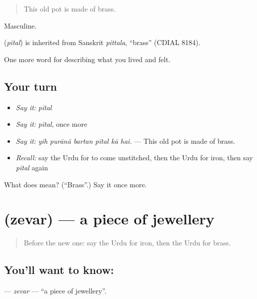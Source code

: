 \begin{quote}
This old pot is made of brass.
\end{quote}

Masculine.

\begin{cousinweb}
\textbf{} (\emph{pītal}) is inherited from Sanskrit \emph{pittala}, \textquotedblleft{}brass\textquotedblright{} (CDIAL 8184).
\end{cousinweb}

\begin{grammarlens}[title={What you've built}]
One more word for describing what you lived and felt.
\end{grammarlens}

\subsection*{Your turn}
\begin{itemize}
\raggedright
  \item \emph{Say it:} \emph{pītal}
  \item \emph{Say it:} \emph{pītal}, once more
  \item \emph{Say it:} \emph{yih purānā bartan pītal kā hai.} — This old pot is made of brass.
  \item \emph{Recall:} say the Urdu for to come unstitched, then the Urdu for iron, then say \emph{pītal} again
\end{itemize}

\begin{tcolorbox}[breakable,colback=teal!4,colframe=teal!35!black,title={Before you move on}]
What does  mean? (\textquotedblleft{}Brass\textquotedblright{}.) Say it once more.
\end{tcolorbox}
\section[\texorpdfstring{\ur{زیور} (zevar)}{زیور (zevar)}]{ (zevar) — a piece of jewellery}

\label{lesson:UR-C501-zevar}



\begin{quote}
Before the new one: say the Urdu for iron, then the Urdu for brass.
\end{quote}

\subsection*{You'll want to know: }
\textbf{} — \emph{zevar} — \textquotedblleft{}a piece of jewellery\textquotedblright{}.

